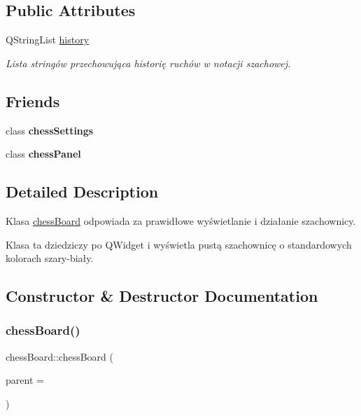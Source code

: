 \subsection*{Public Attributes}
\begin{DoxyCompactItemize}
\item 
\mbox{\label{classchess_board_a4a0184eb6e20074eec3fce6a08e0ff62}} 
Q\+String\+List \hyperlink{classchess_board_a4a0184eb6e20074eec3fce6a08e0ff62}{history}
\begin{DoxyCompactList}\small\item\em Lista stringów przechowująca historię ruchów w notacji szachowej. \end{DoxyCompactList}\end{DoxyCompactItemize}
\subsection*{Friends}
\begin{DoxyCompactItemize}
\item 
\mbox{\label{classchess_board_a789fcbbf0675ebb167838f8f7e11fafa}} 
class {\bfseries chess\+Settings}
\item 
\mbox{\label{classchess_board_a9b25e97c3caab58490ce854e1e72e975}} 
class {\bfseries chess\+Panel}
\end{DoxyCompactItemize}


\subsection{Detailed Description}
Klasa \hyperlink{classchess_board}{chess\+Board} odpowiada za prawidłowe wyświetlanie i działanie szachownicy. 

Klasa ta dziedziczy po Q\+Widget i wyświetla pustą szachownicę o standardowych kolorach szary-\/biały. 

\subsection{Constructor \& Destructor Documentation}
\mbox{\label{classchess_board_a3ffc09a4d95deaca0f6744ae25bb4f62}} 
\subsubsection{\texorpdfstring{chess\+Board()}{chessBoard()}}
{\footnotesize\ttfamily chess\+Board\+::chess\+Board (\begin{DoxyParamCaption}\item[{Q\+Widget $\ast$}]{parent = {} }\end{DoxyParamCaption})}



